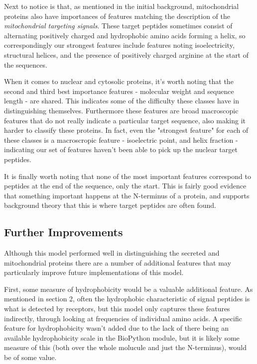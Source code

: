 \documentclass{bioinfo}
\begin{document}
Next to notice is that, as mentioned in the initial background, mitochondrial proteins also have importances of features matching the description of the \textit{mitochondrial targeting signals}. 
These target peptides sometimes consist of alternating positively charged and hydrophobic amino acids forming a helix, so correspondingly our strongest features include features noting isoelectricity, structural helices, and the presence of positively charged arginine at the start of the sequences.

When it comes to nuclear and cytosolic proteins, it's worth noting that the second and third best importance features - molecular weight and sequence length - are shared. 
This indicates some of the difficulty these classes have in distinguishing themselves.  
Furthermore these features are broad macroscopic features that do not really indicate a particular target sequence, also making it harder to classify these proteins. 
In fact, even the "strongest feature" for each of these classes is a macroscropic feature - isoelectric point, and helix fraction - indicating our set of features haven't been able to pick up the nuclear target peptides.

It is finally worth noting that none of the most important features correspond to peptides at the end of the sequence, only the start.  This is fairly good evidence that something important happens at the N-terminus of a protein, and supports background theory that this is where target peptides are often found.


\subsection{Further Improvements}

Although this model performed well in distinguishing the secreted and mitochondrial proteins there are a number of additional features that may particularly improve future implementations of this model. 

First, some measure of hydrophobicity would be a valuable additional feature. 
As mentioned in section 2, often the hydrophobic characteristic of signal peptides is what is detected by receptors, but this model only captures these features indirectly, through looking at frequencies of individual amino acids.
A specific feature for hydrophobicity wasn't added due to the lack of there being an available hydrophobicity scale in the BioPython module, but it is likely some measure of this (both over the whole molucule and just the N-terminus), would be of some value.
\end{document}
